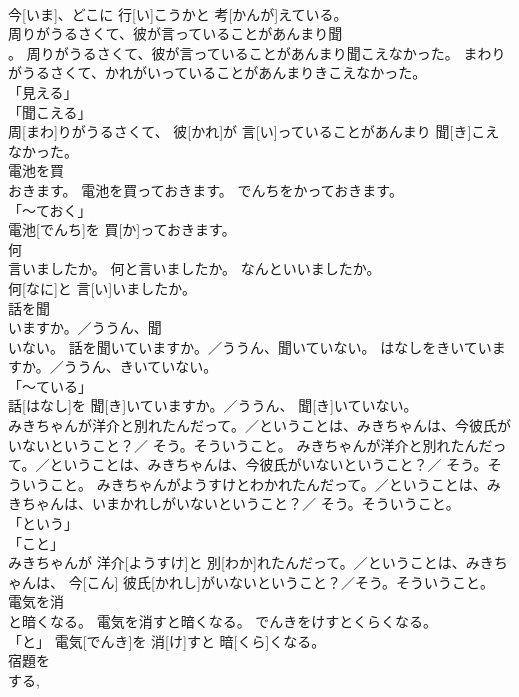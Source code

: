 \documentclass[8pt]{extreport}
\begin{document}
\begin{CJK}{UTF8}{min}
\\	今[いま]、どこに 行[い]こうかと 考[かんが]えている。		
\\	周りがうるさくて、彼が言っていることがあんまり聞
\\	。	周りがうるさくて、彼が言っていることがあんまり聞こえなかった。	まわりがうるさくて、かれがいっていることがあんまりきこえなかった。	
\\	「見える」 
\\	「聞こえる」 
\\	周[まわ]りがうるさくて、 彼[かれ]が 言[い]っていることがあんまり 聞[き]こえなかった。		
\\	電池を買
\\	おきます。	電池を買っておきます。	でんちをかっておきます。	
\\	「～ておく」 
\\	電池[でんち]を 買[か]っておきます。		
\\	何
\\	言いましたか。	何と言いましたか。	なんといいましたか。	
\\	何[なに]と 言[い]いましたか。		
\\	話を聞
\\	いますか。／ううん、聞
\\	いない。	話を聞いていますか。／ううん、聞いていない。	はなしをきいていますか。／ううん、きいていない。	
\\	「～ている」 
\\	話[はなし]を 聞[き]いていますか。／ううん、 聞[き]いていない。		
\\	みきちゃんが洋介と別れたんだって。／ということは、みきちゃんは、今彼氏がいないということ？／ そう。そういうこと。	みきちゃんが洋介と別れたんだって。／ということは、みきちゃんは、今彼氏がいないということ？／ そう。そういうこと。	みきちゃんがようすけとわかれたんだって。／ということは、みきちゃんは、いまかれしがいないということ？／ そう。そういうこと。	
\\	「という」 
\\	「こと」 
\\	みきちゃんが 洋介[ようすけ]と 別[わか]れたんだって。／ということは、みきちゃんは、 今[こん] 彼氏[かれし]がいないということ？／そう。そういうこと。		
\\	電気を消
\\	と暗くなる。	電気を消すと暗くなる。	でんきをけすとくらくなる。	
\\	「と」	電気[でんき]を 消[け]すと 暗[くら]くなる。		
\\	宿題を
\\	する, 

\end{CJK}
\end{document}
